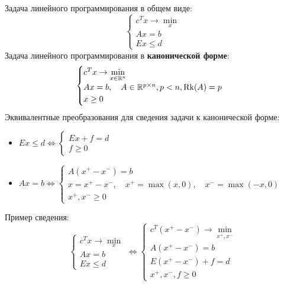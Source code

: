 Задача линейного программирования в общем виде:
\[
    \begin{cases}
        c^{T} x \to \min\limits_{x} \\
        Ax = b \\
        Ex \leq d
    \end{cases}
\]
Задача линейного программирования в \textbf{канонической форме}:
\[
    \begin{cases}
        c^{T} x \to \min\limits_{x \in \mathbb{R}^{n}} \\
        Ax = b, \quad A \in \mathbb{R}^{p \times n}, p < n, \operatorname{Rk}(A) = p \\
        x \geq 0
    \end{cases}
\]
Эквивалентные преобразования для сведения задачи к канонической форме:
\begin{itemize}
    \item $Ex \leq d \Leftrightarrow \begin{cases}
                                         Ex + f = d \\ f \geq 0
    \end{cases}$
    \item $Ax = b \Leftrightarrow \begin{cases}
                                      A(x^{+} - x^{-}) = b \\ x = x^{+} - x^{-}, \quad x^{+} = \max(x, 0), \quad x^{-} = \max(-x, 0) \\ x^{+}, x^{-} \geq 0
    \end{cases}$
\end{itemize}
Пример сведения:
\[
    \begin{cases}
        c^{T} x \to \min\limits_{x} \\
        Ax = b \\
        Ex \leq d
    \end{cases}
    \Leftrightarrow
    \begin{cases}
        c^{T} (x^{+} - x^{-}) \to \min\limits_{x^{+}, x^{-}} \\
        A(x^{+} - x^{-}) = b \\
        E(x^{+} - x^{-}) + f = d \\
        x^{+}, x^{-}, f \geq 0
    \end{cases}
\]